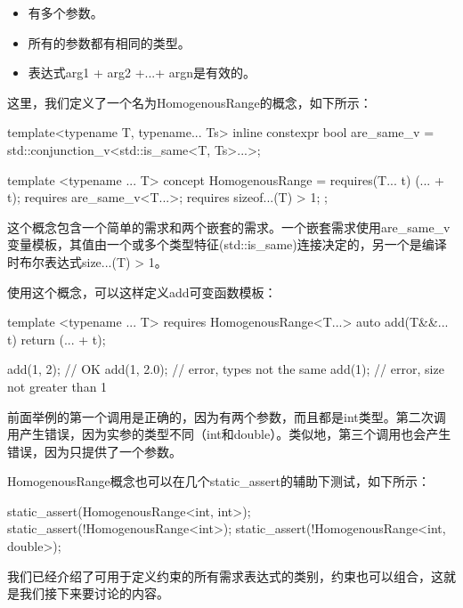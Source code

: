\begin{itemize}
\item
有多个参数。

\item
所有的参数都有相同的类型。

\item
表达式arg1 + arg2 +...+ argn是有效的。
\end{itemize}

这里，我们定义了一个名为HomogenousRange的概念，如下所示：

\begin{cpp}
template<typename T, typename... Ts>
inline constexpr bool are_same_v =
	std::conjunction_v<std::is_same<T, Ts>...>;
	
template <typename ... T>
concept HomogenousRange = requires(T... t)
{
	(... + t);
	requires are_same_v<T...>;
	requires sizeof...(T) > 1;
};
\end{cpp}

这个概念包含一个简单的需求和两个嵌套的需求。一个嵌套需求使用are\_same\_v变量模板，其值由一个或多个类型特征(std::is\_same)连接决定的，另一个是编译时布尔表达式size...(T) > 1。

使用这个概念，可以这样定义add可变函数模板：

\begin{cpp}
template <typename ... T>
requires HomogenousRange<T...>
auto add(T&&... t)
{
	return (... + t);
}

add(1, 2); // OK
add(1, 2.0); // error, types not the same
add(1); // error, size not greater than 1
\end{cpp}

前面举例的第一个调用是正确的，因为有两个参数，而且都是int类型。第二次调用产生错误，因为实参的类型不同（int和double）。类似地，第三个调用也会产生错误，因为只提供了一个参数。

HomogenousRange概念也可以在几个static\_assert的辅助下测试，如下所示：

\begin{cpp}
static_assert(HomogenousRange<int, int>);
static_assert(!HomogenousRange<int>);
static_assert(!HomogenousRange<int, double>);
\end{cpp}

我们已经介绍了可用于定义约束的所有需求表达式的类别，约束也可以组合，这就是我们接下来要讨论的内容。
















